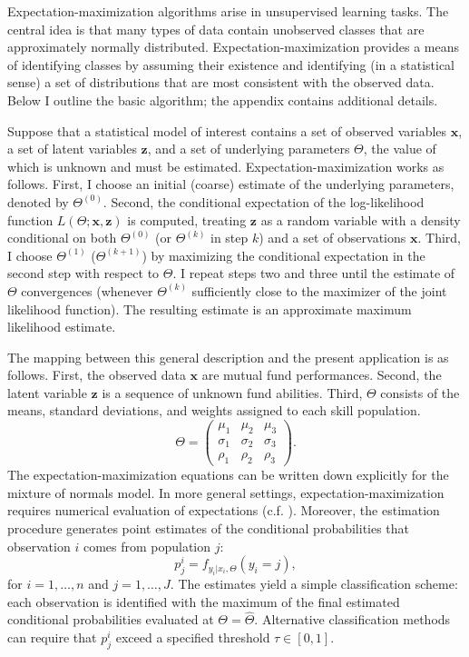 		Expectation-maximization algorithms arise in unsupervised learning tasks.  The central idea is that many types of data contain unobserved classes that are approximately normally distributed.  Expectation-maximization provides a means of identifying classes by assuming their existence and identifying (in a statistical sense) a set of distributions that are most consistent with the observed data.  Below I outline the basic algorithm; the appendix contains additional details.

		Suppose that a statistical model of interest contains a set of observed variables $\mathbf{x}$, a set of latent variables $\mathbf{z}$, and a set of underlying parameters $\Theta$, the value of which is unknown and must be estimated.  Expectation-maximization works as follows.  First, I choose an initial (coarse) estimate of the underlying parameters, denoted by $\Theta^{(0)}$.  Second, the conditional expectation of the log-likelihood function $L(\Theta; \mathbf{x}, \mathbf{z})$ is computed, treating $\mathbf{z}$ as a random variable with a density conditional on both $\Theta^{(0)}$ (or $\Theta^{(k)}$ in step $k$) and a set of observations $\mathbf{x}$.  Third, I choose $\Theta^{(1)}$ ($\Theta^{(k+1)}$) by maximizing the conditional expectation in the second step with respect to $\Theta$.  I repeat steps two and three until the estimate of $\Theta$ convergences (whenever $\Theta^{(k)}$ sufficiently close to the maximizer of the joint likelihood function).  The resulting estimate is an approximate maximum likelihood estimate.

		The mapping between this general description and the present application is as follows.  First, the observed data $\mathbf{x}$ are mutual fund performances.  Second, the latent variable $\mathbf{z}$ is a sequence of unknown fund abilities.  Third, $\Theta$ consists of the means, standard deviations, and weights assigned to each skill population.
		\begin{equation} \label{eqn:mixture}
			\Theta = \begin{pmatrix} \mu_1 & \mu_2 & \mu_3 \\ \sigma_1 & \sigma_2 & \sigma_3 \\ \rho_1 & \rho_2 & \rho_3 \end{pmatrix}.
		\end{equation}
		The expectation-maximization equations can be written down explicitly for the mixture of normals model. In more general settings, expectation-maximization requires numerical evaluation of expectations (c.f. \citet{Casella2010}). Moreover, the estimation procedure generates point estimates of the conditional probabilities that observation $i$ comes from population $j$:
		\begin{equation}
			\label{eq:posterior}
			p_j^i = f_{ y_i | x_i, \Theta}(y_i = j),
		\end{equation}
		for $ i = 1, \dots, n$ and $ j = 1, \dots, J$. The estimates yield a simple classification scheme: each observation is identified with the maximum of the final estimated conditional probabilities evaluated at $\Theta = \hat{\Theta}$.  Alternative classification methods can require that $p_j^i$ exceed a specified threshold $\tau \in [0, 1]$.


